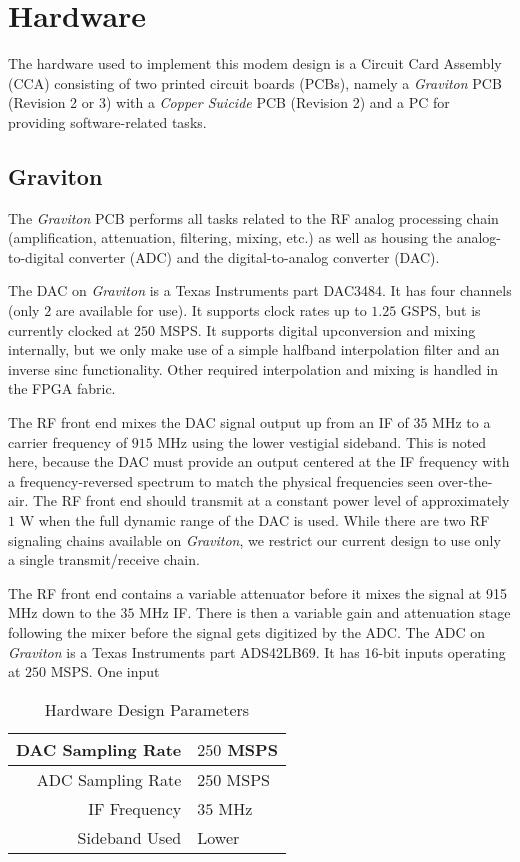 \documentclass[conference]{IEEEtran}
\begin{document}
\section{Hardware}
\label{sec:hardware}

The hardware used to implement this modem design is a Circuit Card
Assembly (CCA) consisting of two printed circuit boards (PCBs), namely
a \emph{Graviton} PCB (Revision 2 or 3) with a \emph{Copper Suicide} PCB
(Revision 2) and a PC for providing software-related tasks.

\subsection*{Graviton}

The \emph{Graviton} PCB performs all tasks related to the RF analog
processing chain (amplification, attenuation, filtering, mixing, etc.)
as well as housing the analog-to-digital converter (ADC) and the
digital-to-analog converter (DAC).

The DAC on \emph{Graviton} is a Texas Instruments part DAC3484. It has
four channels (only $2$ are available for use). It supports clock rates
up to $1.25$ GSPS, but is currently clocked at $250$ MSPS. It supports
digital upconversion and mixing internally, but we only make use of a
simple halfband interpolation filter and an inverse sinc functionality.
Other required interpolation and mixing is handled in the FPGA fabric.

The RF front end mixes the DAC signal output up from an IF of $35$ MHz
to a carrier frequency of $915$ MHz using the lower vestigial sideband.
This is noted here, because the DAC must provide an output centered
at the IF frequency with a frequency-reversed spectrum to match the
physical frequencies seen over-the-air. The RF front end should transmit
at a constant power level of approximately $1$ W when the full dynamic
range of the DAC is used. While there are two RF signaling chains
available on \emph{Graviton}, we restrict our current design to use
only a single transmit/receive chain.

The RF front end contains a variable attenuator before it mixes the
signal at 915 MHz down to the $35$ MHz IF. There is then a variable
gain and attenuation stage following the mixer before the signal
gets digitized by the ADC. The ADC on \emph{Graviton} is a Texas
Instruments part ADS42LB69. It has $16$-bit inputs operating at
$250$ MSPS. One input

\begin{table}
\begin{tabular}{|r|l|}
\hline
DAC Sampling Rate & $250$ MSPS \\
\hline
ADC Sampling Rate & $250$ MSPS \\
\hline
IF Frequency & $35$ MHz \\
\hline
Sideband Used & Lower \\
\hline
\end{tabular}
\centering
\vspace{0.125in}
\caption[Hardware Parameters]{Hardware Design Parameters}
\end{table}
\end{document}
